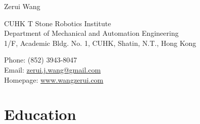 \documentclass[10pt,letterpaper]{article}
\def\name{Zerui Wang}
\begin{document}
{\huge \name}


\bigskip

\begin{minipage}[t]{0.595\textwidth}
  CUHK T Stone Robotics Institute \\
  Department of Mechanical and Automation Engineering \\
  1/F, Academic Bldg. No. 1, CUHK, Shatin, N.T., Hong Kong
\end{minipage}
\begin{minipage}[t]{0.395\textwidth}
  Phone: (852) 3943-8047 \\
  Email: \href{mailto:zerui.j.wang@gmail.com}{zerui.j.wang@gmail.com} \\
  Homepage: \href{http://www.wangzerui.com/}{www.wangzerui.com}
\end{minipage}

\section*{Education}
\end{document}
